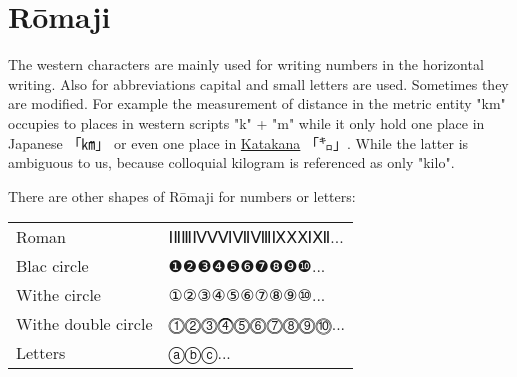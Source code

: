 \section{Rōmaji }
\label{sec:Romaji}



The western characters are mainly used for writing numbers in the horizontal
writing. Also for abbreviations capital and small letters are used. Sometimes
they are modified. For example the measurement of distance in the metric entity
"km" occupies to places in western scripts "k" + "m" while it only hold one
place in Japanese {「㎞」} or even one place in
\hyperref[sec:Katakana]{Katakana}  {「㌔」}. While the latter is ambiguous to
us, because colloquial kilogram is referenced as only "kilo".


There are other shapes of Rōmaji for numbers or letters:


\begin{center}
\begin{tabular}{ll}
Roman       &ⅠⅡⅢⅣⅤⅥⅦⅧⅨⅩⅪⅫ...\\
Blac circle & ❶❷❸❹❺❻❼❽❾❿...\\
Withe circle &①②③④⑤⑥⑦⑧⑨⑩...\\
Withe double circle & ⓵⓶⓷⓸⓹⓺⓻⓼⓽⓾...\\
Letters             &ⓐⓑⓒ...\\
\end{tabular}
\end{center}


